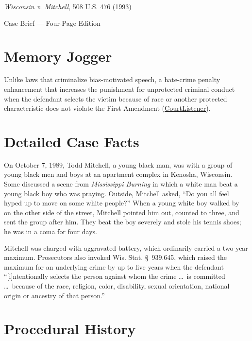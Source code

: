 \documentclass[12pt]{article}
\begin{document}
\begin{center}
{\LARGE \textit{Wisconsin v. Mitchell}, 508 U.S. 476 (1993)\par}
\vspace{0.8em}
{\large Case Brief --- Four-Page Edition\par}
\end{center}
\vspace{1em}

\section{Memory Jogger}

Unlike laws that criminalize bias-motivated speech, a hate-crime penalty enhancement that increases the punishment for unprotected criminal conduct when the defendant selects the victim because of race or another protected characteristic does not violate the First Amendment (\href{https://www.courtlistener.com/opinion/112879/wisconsin-v-mitchell/}{CourtListener}).

\section{Detailed Case Facts}

On October 7, 1989, Todd Mitchell, a young black man, was with a group of young black men and boys at an apartment complex in Kenosha, Wisconsin. Some discussed a scene from \textit{Mississippi Burning} in which a white man beat a young black boy who was praying. Outside, Mitchell asked, ``Do you all feel hyped up to move on some white people?'' When a young white boy walked by on the other side of the street, Mitchell pointed him out, counted to three, and sent the group after him. They beat the boy severely and stole his tennis shoes; he was in a coma for four days.

Mitchell was charged with aggravated battery, which ordinarily carried a two-year maximum. Prosecutors also invoked Wis. Stat. \S~939.645, which raised the maximum for an underlying crime by up to five years when the defendant ``[i]ntentionally selects the person against whom the crime \ldots\ is committed \ldots\ because of the race, religion, color, disability, sexual orientation, national origin or ancestry of that person.''

\section{Procedural History}
\end{document}
